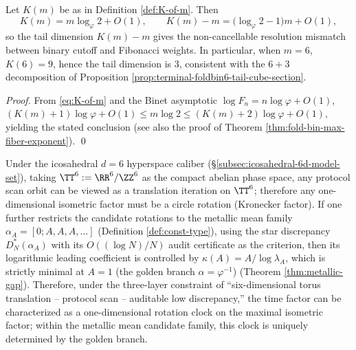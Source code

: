 \begin{corollary}\label{cor:terminal-Km-depth-rescaling}
Let \(K(m)\) be as in Definition \ref{def:K-of-m}.
Then
\[
K(m)=m\log_{\varphi}2+O(1),
\qquad
K(m)-m=\bigl(\log_{\varphi}2-1\bigr)m+O(1),
\]
so the tail dimension \(K(m)-m\) gives the non-cancellable resolution mismatch between binary cutoff and Fibonacci weights.
In particular, when \(m=6\), \(K(6)=9\), hence the tail dimension is \(3\), consistent with the \(6{+}3\) decomposition of Proposition \ref{prop:terminal-foldbin6-tail-cube-section}.
\end{corollary}
\begin{proof}
From \eqref{eq:K-of-m} and the Binet asymptotic \(\log F_n=n\log\varphi+O(1)\),
\(
(K(m)+1)\log\varphi+O(1)\le m\log 2\le (K(m)+2)\log\varphi+O(1)
\), yielding the stated conclusion (see also the proof of Theorem \ref{thm:fold-bin-max-fiber-exponent}). \qed
\end{proof}

\begin{corollary}\label{cor:terminal-time-factor-metallic-unique}
Under the icosahedral \(d=6\) hyperspace caliber (\S\ref{subsec:icosahedral-6d-model-set}), taking
\(
\TT^6:=\RR^6/\ZZ^6
\)
as the compact abelian phase space, any protocol scan orbit can be viewed as a translation iteration on \(\TT^6\); therefore any one-dimensional isometric factor must be a circle rotation (Kronecker factor).
If one further restricts the candidate rotations to the metallic mean family \(\alpha_A=[0;A,A,A,\dots]\) (Definition \ref{def:const-type}), using the star discrepancy \(D_N^\ast(\alpha_A)\) with its \(O((\log N)/N)\) audit certificate as the criterion, then its logarithmic leading coefficient is controlled by
\(
\kappa(A)=A/\log\lambda_A
\),
which is strictly minimal at \(A=1\) (the golden branch \(\alpha=\varphi^{-1}\)) (Theorem \ref{thm:metallic-gap}).
Therefore, under the three-layer constraint of ``six-dimensional torus translation -- protocol scan -- auditable low discrepancy,'' the time factor can be characterized as a one-dimensional rotation clock on the maximal isometric factor; within the metallic mean candidate family, this clock is uniquely determined by the golden branch.
\end{corollary}

